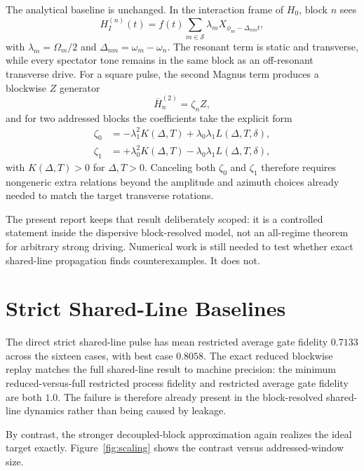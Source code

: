 \documentclass[aps,pra,twocolumn,reprint,floatfix,amsmath,amssymb]{revtex4-2}
\begin{document}
The analytical baseline is unchanged. In the interaction frame of \(H_0\), block \(n\) sees
\begin{equation}
H_I^{(n)}(t)=f(t)\sum_{m\in\mathcal S}\lambda_m X_{\phi_m-\Delta_{nm}t},
\end{equation}
with \(\lambda_m=\Omega_m/2\) and \(\Delta_{nm}=\omega_m-\omega_n\). The resonant term is static and transverse, while every spectator tone remains in the same block as an off-resonant transverse drive. For a square pulse, the second Magnus term produces a blockwise \(Z\) generator
\begin{equation}
\overline{H}_n^{(2)}=\zeta_n Z,
\end{equation}
and for two addressed blocks the coefficients take the explicit form
\begin{align}
\zeta_0 &= -\lambda_1^2 K(\Delta,T)+\lambda_0\lambda_1 L(\Delta,T,\delta), \\
\zeta_1 &= +\lambda_0^2 K(\Delta,T)-\lambda_0\lambda_1 L(\Delta,T,\delta),
\end{align}
with \(K(\Delta,T)>0\) for \(\Delta,T>0\). Canceling both \(\zeta_0\) and \(\zeta_1\) therefore requires nongeneric extra relations beyond the amplitude and azimuth choices already needed to match the target transverse rotations.

The present report keeps that result deliberately scoped: it is a controlled statement inside the dispersive block-resolved model, not an all-regime theorem for arbitrary strong driving. Numerical work is still needed to test whether exact shared-line propagation finds counterexamples. It does not.

\section{Strict Shared-Line Baselines}
\label{sec:baselines}

The direct strict shared-line pulse has mean restricted average gate fidelity \(0.7133\) across the sixteen cases, with best case \(0.8058\). The exact reduced blockwise replay matches the full shared-line result to machine precision: the minimum reduced-versus-full restricted process fidelity and restricted average gate fidelity are both \(1.0\). The failure is therefore already present in the block-resolved shared-line dynamics rather than being caused by leakage.

By contrast, the stronger decoupled-block approximation again realizes the ideal target exactly. Figure~\ref{fig:scaling} shows the contrast versus addressed-window size.
\end{document}
